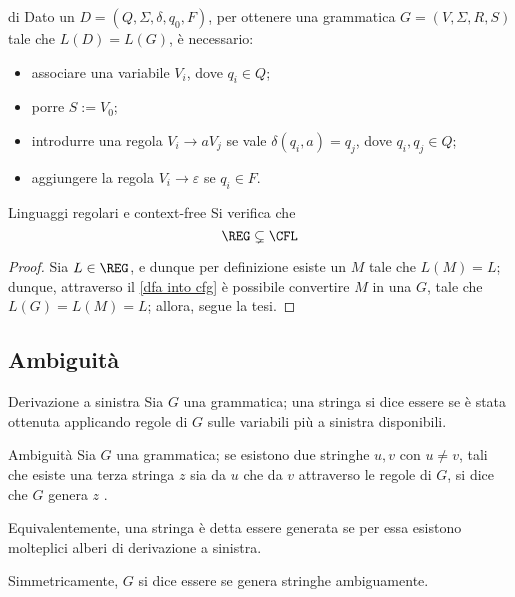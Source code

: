 \documentclass[a4paper, 12pt]{report}
\begin{document}
    \begin{framedmeth}[label={dfa into cfg}]{\CFG di \DFA}
        Dato un \DFA $D = (Q, \Sigma, \delta, q_0, F)$, per ottenere una grammatica $G = (V, \Sigma, R, S)$ tale che $L(D) = L(G)$, è necessario:

        \begin{itemize}
            \item associare una variabile $V_i$, dove $q_i \in Q$;
            \item porre $S := V_0$;
            \item introdurre una regola $V_i \to a V_j$ se vale $\delta(q_i, a) = q_j$, dove $q_i, q_j \in Q$;
            \item aggiungere la regola $V_i \to \varepsilon$ se $q_i \in F$.
        \end{itemize}
    \end{framedmeth}

    \begin{framedcor}[label={reg subset cfl}]{Linguaggi regolari e context-free}
        Si verifica che $$\REG \subsetneq \CFL$$
    \end{framedcor}

    \begin{proof}
        Sia $L \in \REG$, e dunque per definizione esiste un \DFA $M$ tale che  $L(M) = L$; dunque, attraverso il \cref{dfa into cfg} è possibile convertire $M$ in una \CFG $G$, tale che $L(G) = L(M) = L$; allora, segue la tesi.
    \end{proof}
   
    \subsection{Ambiguità}

    \begin{frameddefn}{Derivazione a sinistra}
        Sia $G$ una grammatica; una stringa si dice essere  se è stata ottenuta applicando regole di $G$ sulle variabili più a sinistra disponibili.
    \end{frameddefn}

    \begin{frameddefn}{Ambiguità}
        Sia $G$ una grammatica; se esistono due stringhe $u, v$ con $u \neq v$, tali che esiste una terza stringa $z$  sia da $u$ che da $v$ attraverso le regole di $G$, si dice che $G$ genera $z$ .

        Equivalentemente, una stringa è detta essere generata  se per essa esistono molteplici alberi di derivazione a sinistra.

        Simmetricamente, $G$ si dice essere  se genera stringhe ambiguamente.
    \end{frameddefn}
\end{document}
